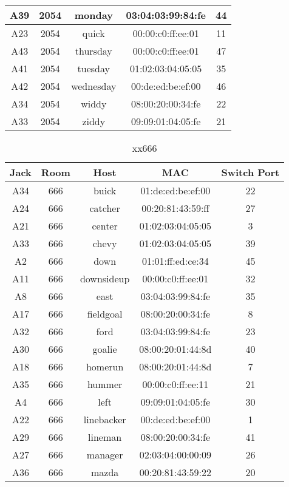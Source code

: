 \documentclass{article}
\begin{document}
\begin{table}[H]
\begin{tabular}{ | c | c | c | c | c | }
A39 & 2054 & monday & 03:04:03:99:84:fe & 44
 \\ \hline
A23 & 2054 & quick & 00:00:c0:ff:ee:01 & 11
 \\ \hline
A43 & 2054 & thursday & 00:00:c0:ff:ee:01 & 47
 \\ \hline
A41 & 2054 & tuesday & 01:02:03:04:05:05 & 35
 \\ \hline
A42 & 2054 & wednesday & 00:de:ed:be:ef:00 & 46
 \\ \hline
A34 & 2054 & widdy & 08:00:20:00:34:fe & 22
 \\ \hline
A33 & 2054 & ziddy & 09:09:01:04:05:fe & 21
 \\ \hline
\end{tabular}
\end{table}
\begin{table}[H]
\caption{xx666} \label{tab:title}
\centering
\begin{tabular}{ | c | c | c | c | c | } \hline
Jack & Room & Host & MAC & Switch Port \\ \hline
A34 & 666 & buick & 01:de:ed:be:ef:00 & 22
 \\ \hline
A24 & 666 & catcher & 00:20:81:43:59:ff & 27
 \\ \hline
A21 & 666 & center & 01:02:03:04:05:05 & 3
 \\ \hline
A33 & 666 & chevy & 01:02:03:04:05:05 & 39
 \\ \hline
A2 & 666 & down & 01:01:ff:ed:ce:34 & 45
 \\ \hline
A11 & 666 & downsideup & 00:00:c0:ff:ee:01 & 32
 \\ \hline
A8 & 666 & east & 03:04:03:99:84:fe & 35
 \\ \hline
A17 & 666 & fieldgoal & 08:00:20:00:34:fe & 8
 \\ \hline
A32 & 666 & ford & 03:04:03:99:84:fe & 23
 \\ \hline
A30 & 666 & goalie & 08:00:20:01:44:8d & 40
 \\ \hline
A18 & 666 & homerun & 08:00:20:01:44:8d & 7
 \\ \hline
A35 & 666 & hummer & 00:00:c0:ff:ee:11 & 21
 \\ \hline
A4 & 666 & left & 09:09:01:04:05:fe & 30
 \\ \hline
A22 & 666 & linebacker & 00:de:ed:be:ef:00 & 1
 \\ \hline
A29 & 666 & lineman & 08:00:20:00:34:fe & 41
 \\ \hline
A27 & 666 & manager & 02:03:04:00:00:09 & 26
 \\ \hline
A36 & 666 & mazda & 00:20:81:43:59:22 & 20

\end{tabular}
\end{table}
\end{document}
